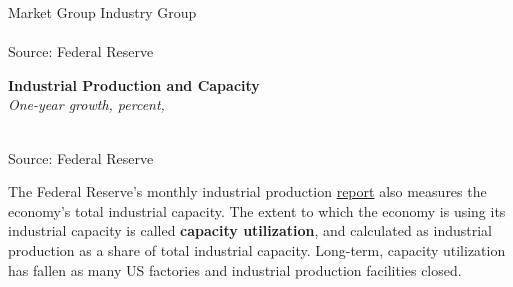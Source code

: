 \documentclass{report}
\newcommand{\tbllink}[1]{\href{https://raw.githubusercontent.com/bdecon/US-chartbook/master/chartbook/data/#1}{\faTable}}
\newcommand{\barylab}[2]{yticklabel style={text width=#1, align=right, 
		style={black!70}, text height=#2},}
\newcommand{\bbar}[2]{extra #1 ticks = {{#2}}, extra #1 tick labels = ,
		extra #1 tick style = {grid=major, grid style={thick, black!25}},}
\newcommand{\barplotnogrid}{xbar=0pt, axis line style={draw=none},
	    yticklabel style={align=left, anchor=east},
      		xmajorticks=false, ymajorgrids=false,   
	    ytick=data, tickwidth=0pt, area legend, reverse legend,
	    nodes near coords, nodes near coords align={horizontal},}
\begin{document}
{\begin{minipage}{0.76\textwidth}
\normalsize \hspace{14mm} Market Group \hspace{38mm} Industry Group \footnotesize \\
\\
\footnotesize{Source: Federal Reserve} \hfill \tbllink{indprogr_rec.csv}
\end{minipage}
\newpage
\begin{minipage}{0.3\textwidth}
\small 
\end{minipage} \hspace{5mm}
\begin{minipage}{0.42\textwidth}
\normalsize \textbf{Industrial Production and Capacity}\\
\footnotesize{\textit{One-year growth, percent, }}\\
\hspace*{-5mm} \\
\footnotesize{Source: Federal Reserve} \hfill \tbllink{ip_comp.csv}
\end{minipage}
\vspace{2mm}

\begin{minipage}{0.76\textwidth}
\small The Federal Reserve's monthly industrial production \href{https://www.federalreserve.gov/releases/g17/}{report} also measures the economy's total industrial capacity. The extent to which the economy is using its industrial capacity is called \textbf{capacity utilization}, and calculated as industrial production as a share of total industrial capacity. Long-term, capacity utilization has fallen as many US factories and industrial production facilities closed. 
\vspace{2mm}


\end{minipage}}
\end{document}

